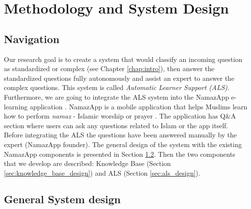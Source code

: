 \chapter{Methodology and System Design}
\label{chap:met}

\section{Navigation}


Our research goal is to create a system that would classify an incoming question as standardized or complex (see Chapter \ref{chap:intro}), then answer the standardized questions fully autonomously and assist an expert to answer the complex questions. This system is called \textit{Automatic Learner Support (ALS)}. Furthermore, we are going to integrate the ALS system into the NamazApp e-learning application \cite{namazapp}. NamazApp is a mobile application that helps Muslims learn how to perform \textit{namaz} - Islamic worship or prayer \cite{merriamwebster2025}. The application has Q\&A section where users can ask any questions related to Islam or the app itself. Before integrating the ALS the questions have been answered manually by the expert (NamazApp founder). The general design of the system with the existing NamazApp components is presented in Section \ref{sec:system_design}. Then the two components that we develop are described: Knowledge Base (Section \ref{sec:knowledge_base_design}) and ALS (Section \ref{sec:als_design}).

\section{General System design}
\label{sec:system_design}

